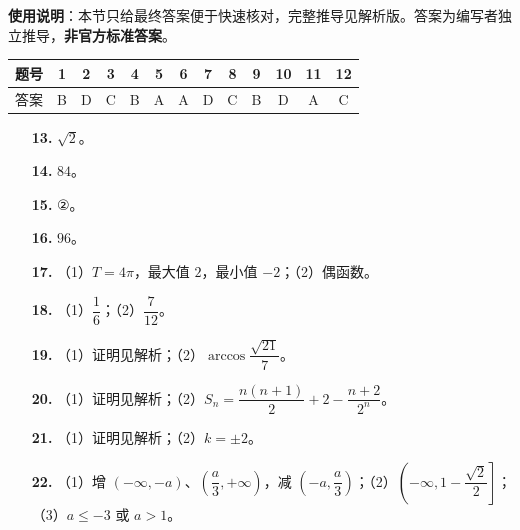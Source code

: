 
\begin{gknotice}
\textbf{使用说明}：本节只给最终答案便于快速核对，完整推导见解析版。答案为编写者独立推导，\textbf{非官方标准答案}。
\end{gknotice}

\begin{center}\begin{tabular}{ccccccccccccc}
\toprule
题号 & 1 & 2 & 3 & 4 & 5 & 6 & 7 & 8 & 9 & 10 & 11 & 12 \\
\midrule
答案 & B & D & C & B & A & A & D & C & B & D & A & C \\
\bottomrule
\end{tabular}\end{center}

\begin{itemize}[leftmargin=2.6em]
  \item[\textbf{13.}] $\sqrt2$。
  \item[\textbf{14.}] $84$。
  \item[\textbf{15.}] ②。
  \item[\textbf{16.}] $96$。
\end{itemize}

\begin{itemize}[leftmargin=2.6em]
  \item[\textbf{17.}] （1）$T=4\pi$，最大值 $2$，最小值 $-2$；（2）偶函数。
  \item[\textbf{18.}] （1）$\dfrac16$；（2）$\dfrac7{12}$。
  \item[\textbf{19.}] （1）证明见解析；（2）$\arccos\dfrac{\sqrt{21}}7$。
  \item[\textbf{20.}] （1）证明见解析；（2）$S_n=\dfrac{n(n+1)}2+2-\dfrac{n+2}{2^n}$。
  \item[\textbf{21.}] （1）证明见解析；（2）$k=\pm2$。
  \item[\textbf{22.}] （1）增 $(-\infty,-a)$、$\left(\dfrac a3,+\infty\right)$，减 $\left(-a,\dfrac a3\right)$；（2）$\left(-\infty,1-\dfrac{\sqrt2}2\right]$；（3）$a\leqslant-3$ 或 $a>1$。
\end{itemize}
